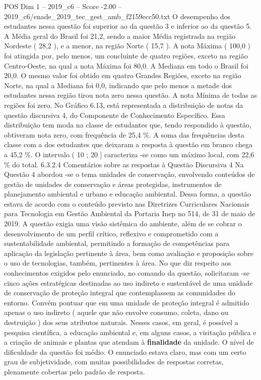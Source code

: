 \begin{textsample}{POS Dim 1 – 2019\_c6 – Score -2.00 – 2019\_c6/enade\_2019\_tec\_gest\_amb\_f2159ecc50.txt}
O desempenho dos estudantes nessa questão foi superior ao da questão 3 e inferior ao da questão 5.
A Média geral do Brasil foi 21,2, sendo a maior Média registrada na região Nordeste ( 28,2 ), e a menor, na região Norte ( 15,7 ).
A nota Máxima ( 100,0 ) foi atingida por, pelo menos, um concluinte de quatro regiões, exceto na região Centro-Oeste, na qual a nota Máxima foi 80,0.
A Mediana em todo o Brasil foi 20,0.
O mesmo valor foi obtido em quatro Grandes Regiões, exceto na região Norte, na qual a Mediana foi 0,0, indicando que pelo menos a metade dos estudantes nessa região tirou nota zero nessa questão.
A nota Mínima de todas as regiões foi zero.
No Gráfico 6.13, está representada a distribuição de notas da questão discursiva 4, do Componente de Conhecimento Específico.
Essa distribuição tem moda na classe de estudantes que, tendo respondido à questão, obtiveram nota zero, com frequência de 25,4 \%.
A soma das frequências desta classe com a dos estudantes que deixaram a resposta à questão em branco chega a 45,2 \%.
O intervalo ( 10 ; 20 ] caracteriza -se como um máximo local, com 22,6 \% do total. 6.3.2.4 Comentários sobre as respostas à Questão Discursiva 4 Na Questão 4 abordou -se o tema unidades de conservação, envolvendo conteúdos de gestão de unidades de conservação e áreas protegidas, instrumentos de planejamento ambiental e urbano e educação ambiental.
Dessa forma, a questão estava de acordo com o conteúdo previsto nas Diretrizes Curriculares Nacionais para Tecnologia em Gestão Ambiental da Portaria Inep no 514, de 31 de maio de 2019.
A questão exigia uma visão sistêmica do ambiente, além de se cobrar o desenvolvimento de um perfil crítico, reflexivo e comprometido com a sustentabilidade ambiental, permitindo a formação de competências para aplicação da legislação pertinente à área, bem como avaliação e proposição sobre o uso de tecnologias, também, pertinentes à área.
No que diz respeito aos conhecimentos exigidos pelo enunciado, no comando da questão, solicitaram -se cinco ações estratégicas destinadas ao uso indireto e sustentável de uma unidade de conservação de proteção integral que contemplassem as comunidades do entorno.
Convém pontuar que em uma unidade de proteção integral é admitido apenas o uso indireto ( aquele que não envolve consumo, coleta, dano ou destruição ) dos seus atributos naturais.
Nesses casos, em geral, é possível a pesquisa científica, a educação ambiental e, em alguns casos, a visitação pública e a criação de animais e plantas que atendam à \textbf{finalidade} da unidade.
O nível de dificuldade da questão foi médio.
O enunciado estava claro, mas com um certo grau de subjetividade, com muitas possibilidades de respostas corretas, plenamente cobertas pelo padrão de resposta.

\end{textsample}
